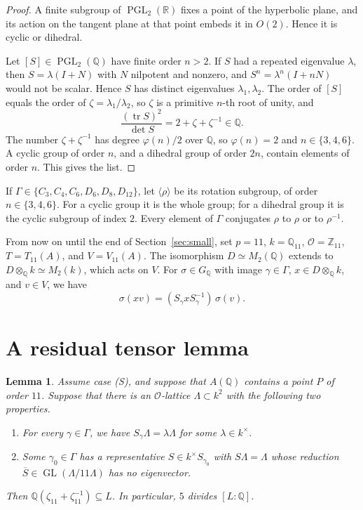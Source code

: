 \documentclass[11pt]{article}
\newtheorem{lemma}{Lemma}
\theoremstyle{remark}
\newcommand{\Q}{\mathbb Q}
\newcommand{\Z}{\mathbb Z}
\newcommand{\R}{\mathbb R}
\DeclareMathOperator{\GL}{GL}
\DeclareMathOperator{\PGL}{PGL}
\begin{document}
\begin{proof}
A finite subgroup of \(\PGL_2(\R)\) fixes a point of the hyperbolic
plane, and its action on the tangent plane at that point embeds it in
\(O(2)\). Hence it is cyclic or dihedral.

Let \([S]\in\PGL_2(\Q)\) have finite order \(n>2\). If \(S\) had a
repeated eigenvalue \(\lambda\), then \(S=\lambda(I+N)\) with \(N\)
nilpotent and nonzero, and \(S^n=\lambda^n(I+nN)\) would not be scalar.
Hence \(S\) has distinct eigenvalues \(\lambda_1,\lambda_2\). The order
of \([S]\) equals the order of \(\zeta=\lambda_1/\lambda_2\), so
\(\zeta\) is a primitive \(n\)-th root of unity, and
\[
 \frac{(\operatorname{tr}S)^2}{\det S}=2+\zeta+\zeta^{-1}\in\Q.
\]
The number \(\zeta+\zeta^{-1}\) has degree \(\varphi(n)/2\) over \(\Q\),
so \(\varphi(n)=2\) and \(n\in\{3,4,6\}\). A cyclic group of order
\(n\), and a dihedral group of order \(2n\), contain elements of order
\(n\). This gives the list.
\end{proof}

If \(\Gamma\in\{C_3,C_4,C_6,D_6,D_8,D_{12}\}\), let
\(\langle\rho\rangle\) be its rotation subgroup, of order
\(n\in\{3,4,6\}\). For a cyclic group it is the whole group; for a
dihedral group it is the cyclic subgroup of index \(2\). Every element
of \(\Gamma\) conjugates \(\rho\) to \(\rho\) or to \(\rho^{-1}\).

From now on until the end of Section~\ref{sec:small}, set \(p=11\),
\(k=\Q_{11}\), \(\mathcal O=\Z_{11}\), \(T=T_{11}(A)\), and
\(V=V_{11}(A)\). The isomorphism \(D\simeq M_2(\Q)\) extends to
\(D\otimes_{\Q}k\simeq M_2(k)\), which acts on \(V\). For
\(\sigma\in G_{\Q}\) with image \(\gamma\in\Gamma\),
\(x\in D\otimes_{\Q}k\), and \(v\in V\), we have
\begin{equation}\label{eq:semilinear}
 \sigma(xv)=(S_\gamma xS_\gamma^{-1})\,\sigma(v).
\end{equation}

\section{A residual tensor lemma}\label{sec:tensor}

\begin{lemma}\label{lem:tensor}
Assume case (S), and suppose that \(A(\Q)\) contains a point \(P\) of
order \(11\). Suppose that there is an \(\mathcal O\)-lattice
\(\Lambda\subset k^2\) with the following two properties.
\begin{enumerate}
\item[(i)] For every \(\gamma\in\Gamma\), we have
\(S_\gamma\Lambda=\lambda\Lambda\) for some \(\lambda\in k^\times\).
\item[(ii)] Some \(\gamma_0\in\Gamma\) has a representative
\(S\in k^\times S_{\gamma_0}\) with \(S\Lambda=\Lambda\) whose
reduction \(\overline S\in\GL(\Lambda/11\Lambda)\) has no eigenvector.
\end{enumerate}
Then \(\Q(\zeta_{11}+\zeta_{11}^{-1})\subseteq L\). In particular,
\(5\) divides \([L:\Q]\).
\end{lemma}
\end{document}
